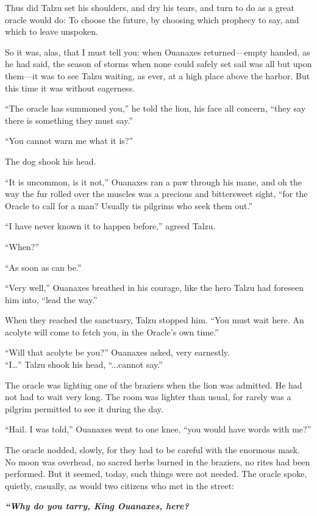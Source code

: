 Thus did Talzu set his shoulders, and dry his tears, and turn to do as a great oracle would do: To choose the future, by choosing which prophecy to say, and which to leave unspoken.

So it was, alas, that I must tell you: when Ouanaxes returned---empty handed, as he had said, the season of storms when none could safely set sail was all but upon them---it was to see Talzu waiting, as ever, at a high place above the harbor. But this time it was without eagerness.

``The oracle has summoned you,'' he told the lion, his face all concern, ``they say there is something they must say.''

``You cannot warn me what it is?''

The dog shook his head.

``It is uncommon, is it not,'' Ouanaxes ran a paw through his mane, and oh the way the fur rolled over the muscles was a precious and bittersweet sight, ``for the Oracle to call for a man? Usually tis pilgrims who seek them out.''

``I have never known it to happen before,'' agreed Talzu.

``When?''

``As soon as can be.''

``Very well,'' Ouanaxes breathed in his courage, like the hero Talzu had foreseen him into, ``lead the way.''

When they reached the sanctuary, Talzu stopped him. ``You must wait here. An acolyte will come to fetch you, in the Oracle's own time.''

``Will that acolyte be you?'' Ouanaxes asked, very earnestly.\\
``I\ldots'' Talzu shook his head, ``...cannot say.''

The oracle was lighting one of the braziers when the lion was admitted. He had not had to wait very long. The room was lighter than usual, for rarely was a pilgrim permitted to see it during the day.

``Hail. I was told,'' Ouanaxes went to one knee, ``you would have words with me?''

The oracle nodded, slowly, for they had to be careful with the enormous mask. No moon was overhead, no sacred herbs burned in the braziers, no rites had been performed. But it seemed, today, such things were not needed. The oracle spoke, quietly, casually, as would two citizens who met in the street:

\emph{\textbf{``Why do you tarry, King Ouanaxes, here?}}

